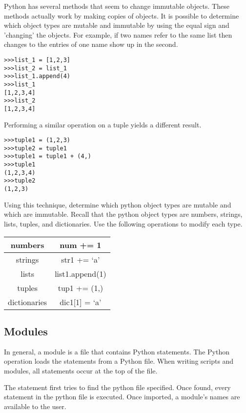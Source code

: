 \begin{problem}
Python has several methods that seem to change immutable objects.
These methods actually work by making copies of objects.
It is possible to determine which object types are mutable and immutable by using the equal sign and 'changing' the objects.
For example, if two names refer to the same list then changes to the entries of one name show up in the second.
\begin{lstlisting}
>>>list_1 = [1,2,3]
>>>list_2 = list_1
>>>list_1.append(4)
>>>list_1
[1,2,3,4]
>>>list_2
[1,2,3,4]
\end{lstlisting}

Performing a similar operation on a tuple yields a different result.
\begin{lstlisting}
>>>tuple1 = (1,2,3)
>>>tuple2 = tuple1
>>>tuple1 = tuple1 + (4,)
>>>tuple1
(1,2,3,4)
>>>tuple2
(1,2,3)
\end{lstlisting}

Using this technique, determine which python object types are mutable and which are immutable.
Recall that the python object types are numbers, strings, lists, tuples, and dictionaries.
Use the following operations to modify each type.
\begin{center}
\begin{tabular}{|c|c|}
\hline
numbers & num += 1 \\
\hline
strings & str1 += `a' \\
\hline
lists & list1.append(1) \\
\hline
tuples & tup1 += (1,) \\
\hline
dictionaries & dic1[1] = `a' \\
\hline
\end{tabular}
\end{center}
\end{problem}

\subsection*{Modules}

In general, a module is a file that contains Python statements.
The Python  operation loads the statements from a Python file.
When writing scripts and modules, all  statements occur at the top of the file.

The  statement first tries to find the python file specified.
Once found, every statement in the python file is executed.
Once imported, a module's names are available to the user.

